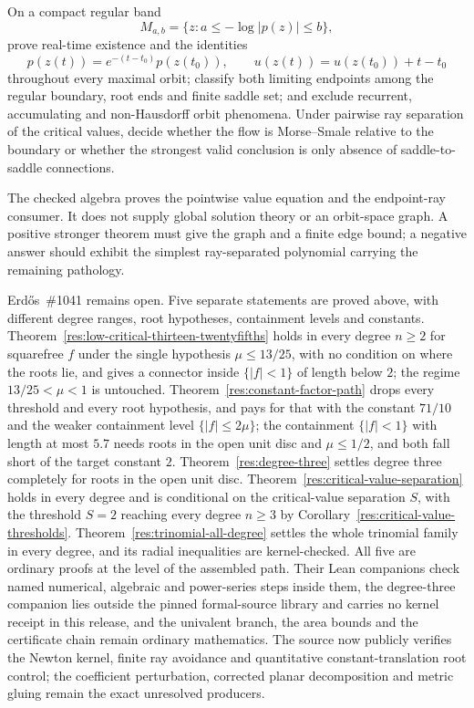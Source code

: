 \begin{problem}\label{prob:globalflow1041}
On a compact regular band
\[
 M_{a,b}=\{z:a\le-\log|p(z)|\le b\},
\]
prove real-time existence and the identities
\[
 p(z(t))=e^{-(t-t_0)}p(z(t_0)),\qquad
 u(z(t))=u(z(t_0))+t-t_0
\]
throughout every maximal orbit; classify both limiting endpoints among the
regular boundary, root ends and finite saddle set; and exclude recurrent,
accumulating and non-Hausdorff orbit phenomena.  Under pairwise ray separation
of the critical values, decide whether the flow is Morse--Smale relative to the
boundary or whether the strongest valid conclusion is only absence of
saddle-to-saddle connections.
\end{problem}

The checked algebra proves the pointwise value equation and the endpoint-ray
consumer.  It does not supply global solution theory or an orbit-space graph.
A positive stronger theorem must give the graph and a finite edge bound; a
negative answer should exhibit the simplest ray-separated polynomial carrying
the remaining pathology.

Erd\H{o}s~\#1041 remains open.  Five separate statements are proved above,
with different degree ranges, root hypotheses, containment levels and
constants.  Theorem~\ref{res:low-critical-thirteen-twentyfifths} holds in
every degree $n\ge2$ for squarefree $f$ under the single hypothesis
$\mu\le13/25$, with no condition on where the roots lie, and gives a
connector inside $\{|f|<1\}$ of length below $2$; the regime
$13/25<\mu<1$ is untouched.  Theorem~\ref{res:constant-factor-path} drops
every threshold and every root hypothesis, and pays for that with the
constant $71/10$ and the weaker containment level $\{|f|\le2\mu\}$; the
containment $\{|f|<1\}$ with length at most $5.7$ needs roots in the open
unit disc and $\mu\le1/2$, and both fall short of the target constant $2$.
Theorem~\ref{res:degree-three} settles degree three completely for roots in
the open unit disc.  Theorem~\ref{res:critical-value-separation} holds in
every degree and is conditional on the critical-value separation $S$, with the
threshold $S=2$ reaching every degree $n\ge3$ by
Corollary~\ref{res:critical-value-thresholds}.
Theorem~\ref{res:trinomial-all-degree} settles the whole trinomial family in
every degree, and its radial inequalities are kernel-checked.  All five are
ordinary proofs at the level of the assembled path.  Their Lean companions check named numerical, algebraic and
power-series steps inside them, the degree-three companion lies outside the
pinned formal-source library and carries no kernel receipt in this release,
and the univalent branch, the area bounds and the certificate chain remain
ordinary mathematics.  The source now publicly verifies the Newton
kernel, finite ray avoidance and quantitative constant-translation root
control; the coefficient perturbation, corrected planar decomposition and
metric gluing remain the exact unresolved producers.

